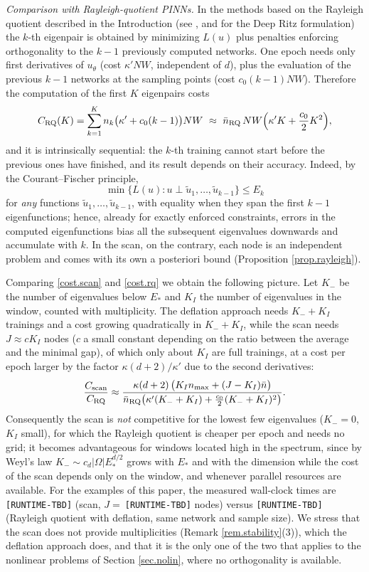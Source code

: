 \emph{Comparison with Rayleigh-quotient PINNs.} In the methods based on the Rayleigh
quotient described in the Introduction (see
\cite{Rowan-Evans-Maute-Dootsan,Holliday-Lindner-Ditto}, and \cite{E-Yu} for the Deep Ritz
formulation) the $k$-th eigenpair is obtained by minimizing $L(u)$ plus penalties enforcing orthogonality
to the $k-1$ previously computed networks. One epoch needs only first derivatives of
$u_\theta$ (cost $\kappa'NW$, independent of $d$), plus the evaluation of the previous
$k-1$ networks at the sampling points (cost $c_0(k-1)NW$). Therefore the computation of
the first $K$ eigenpairs costs
\begin{equation}\label{cost.rq}
C_{\rm RQ}(K)=\sum_{k=1}^Kn_k\big(\kappa'+c_0(k-1)\big)NW
\ \approx\ \bar n_{\rm RQ}\,NW\Big(\kappa'K+\frac{c_0}{2}K^2\Big),
\end{equation}
and it is intrinsically sequential: the $k$-th training cannot start before the previous
ones have finished, and its result depends on their accuracy. Indeed, by the
Courant--Fischer principle,
\[
\min\big\{L(u)\colon u\perp\tilde u_1,\dots,\tilde u_{k-1}\big\}\le E_k
\]
for \emph{any} functions $\tilde u_1,\dots,\tilde u_{k-1}$, with equality when they span
the first $k-1$ eigenfunctions; hence, already for exactly enforced constraints, errors
in the computed eigenfunctions bias all the subsequent eigenvalues downwards and
accumulate with $k$. In the scan, on the contrary,
each node is an independent problem and comes with its own a posteriori bound
(Proposition \ref{prop.rayleigh}).

Comparing \eqref{cost.scan} and \eqref{cost.rq} we obtain the following picture. Let
$K_-$ be the number of eigenvalues below $E_*$ and $K_I$ the number of eigenvalues in the
window, counted with multiplicity. The deflation approach needs $K_-+K_I$ trainings and
a cost growing quadratically in $K_-+K_I$, while the scan needs $J\approx cK_I$ nodes
($c$ a small constant depending on the ratio between the average and the minimal gap),
of which only about $K_I$ are full trainings, at a cost per epoch larger by the factor
$\kappa(d+2)/\kappa'$ due to the second derivatives:
\[
\frac{C_{\rm scan}}{C_{\rm RQ}}\approx
\frac{\kappa(d+2)\,\big(K_In_{\max}+(J-K_I)\bar n\big)}
{\bar n_{\rm RQ}\big(\kappa'(K_-+K_I)+\tfrac{c_0}{2}(K_-+K_I)^2\big)} .
\]
Consequently the scan is \emph{not} competitive for the lowest few eigenvalues
($K_-=0$, $K_I$ small), for which the Rayleigh quotient is cheaper per epoch and needs no
grid; it becomes advantageous for windows located high in the spectrum, since by Weyl's
law $K_-\sim c_d|\Omega|E_*^{d/2}$ grows with $E_*$ and with the dimension while the cost
of the scan depends only on the window, and whenever parallel resources are available.
For the examples of this paper, the measured wall-clock times are
\texttt{[RUNTIME-TBD]} (scan, $J=\ $\texttt{[RUNTIME-TBD]} nodes) versus
\texttt{[RUNTIME-TBD]} (Rayleigh quotient with deflation, same network and sample size).
We stress that the scan does not provide multiplicities (Remark
\ref{rem.stability}(3)), which the deflation approach does, and that it is the only one
of the two that applies to the nonlinear problems of Section \ref{sec.nolin}, where no
orthogonality is available.


